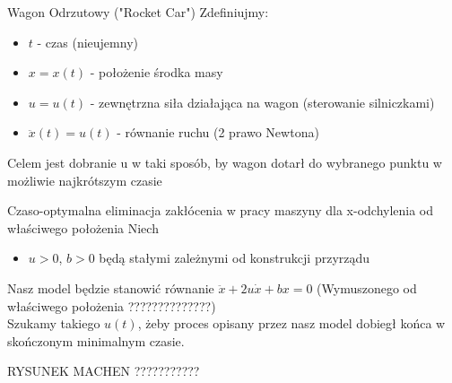 \begin{example}{Wagon Odrzutowy ("Rocket Car")}{}{}
    Zdefiniujmy: \begin{itemize}
        \item $t$ - czas (nieujemny)
        \item $x = x(t)$ - położenie środka masy
        \item $u = u(t)$ - zewnętrzna siła działająca na wagon (sterowanie silniczkami)
        \item $\ddot{x}(t) = u(t)$ - równanie ruchu (2 prawo Newtona)
    \end{itemize}

    Celem jest dobranie u w taki sposób, by wagon dotarł do wybranego punktu w możliwie najkrótszym czasie
\end{example}

\begin{example}{Czaso-optymalna eliminacja zakłócenia w pracy maszyny dla x-odchylenia od właściwego położenia}{}{}
    Niech \begin{itemize}
        \item $u > 0$, $b > 0$ będą stałymi zależnymi od konstrukcji przyrządu
    \end{itemize}
    Nasz model będzie stanowić równanie $\ddot{x} + 2 u \dot{x} + b x = 0$ (Wymuszonego od właściwego położenia ??????????????) \\
    Szukamy takiego $u(t)$, żeby proces opisany przez nasz model dobiegł końca w skończonym minimalnym czasie.

    RYSUNEK MACHEN ???????????
\end{example}

